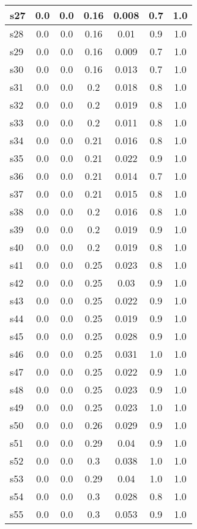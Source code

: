 \documentclass{article}
\begin{document}
\begin{tabular}{|l|c|c|c|c|c|c|}
\hline
s27 &0.0 & 0.0 & 0.16 & 0.008 & 0.7 & 1.0\\
\hline
s28 &0.0 & 0.0 & 0.16 & 0.01 & 0.9 & 1.0\\
\hline
s29 &0.0 & 0.0 & 0.16 & 0.009 & 0.7 & 1.0\\
\hline
s30 &0.0 & 0.0 & 0.16 & 0.013 & 0.7 & 1.0\\
\hline
s31 &0.0 & 0.0 & 0.2 & 0.018 & 0.8 & 1.0\\
\hline
s32 &0.0 & 0.0 & 0.2 & 0.019 & 0.8 & 1.0\\
\hline
s33 &0.0 & 0.0 & 0.2 & 0.011 & 0.8 & 1.0\\
\hline
s34 &0.0 & 0.0 & 0.21 & 0.016 & 0.8 & 1.0\\
\hline
s35 &0.0 & 0.0 & 0.21 & 0.022 & 0.9 & 1.0\\
\hline
s36 &0.0 & 0.0 & 0.21 & 0.014 & 0.7 & 1.0\\
\hline
s37 &0.0 & 0.0 & 0.21 & 0.015 & 0.8 & 1.0\\
\hline
s38 &0.0 & 0.0 & 0.2 & 0.016 & 0.8 & 1.0\\
\hline
s39 &0.0 & 0.0 & 0.2 & 0.019 & 0.9 & 1.0\\
\hline
s40 &0.0 & 0.0 & 0.2 & 0.019 & 0.8 & 1.0\\
\hline
s41 &0.0 & 0.0 & 0.25 & 0.023 & 0.8 & 1.0\\
\hline
s42 &0.0 & 0.0 & 0.25 & 0.03 & 0.9 & 1.0\\
\hline
s43 &0.0 & 0.0 & 0.25 & 0.022 & 0.9 & 1.0\\
\hline
s44 &0.0 & 0.0 & 0.25 & 0.019 & 0.9 & 1.0\\
\hline
s45 &0.0 & 0.0 & 0.25 & 0.028 & 0.9 & 1.0\\
\hline
s46 &0.0 & 0.0 & 0.25 & 0.031 & 1.0 & 1.0\\
\hline
s47 &0.0 & 0.0 & 0.25 & 0.022 & 0.9 & 1.0\\
\hline
s48 &0.0 & 0.0 & 0.25 & 0.023 & 0.9 & 1.0\\
\hline
s49 &0.0 & 0.0 & 0.25 & 0.023 & 1.0 & 1.0\\
\hline
s50 &0.0 & 0.0 & 0.26 & 0.029 & 0.9 & 1.0\\
\hline
s51 &0.0 & 0.0 & 0.29 & 0.04 & 0.9 & 1.0\\
\hline
s52 &0.0 & 0.0 & 0.3 & 0.038 & 1.0 & 1.0\\
\hline
s53 &0.0 & 0.0 & 0.29 & 0.04 & 1.0 & 1.0\\
\hline
s54 &0.0 & 0.0 & 0.3 & 0.028 & 0.8 & 1.0\\
\hline
s55 &0.0 & 0.0 & 0.3 & 0.053 & 0.9 & 1.0\\

\end{tabular}
\end{document}
